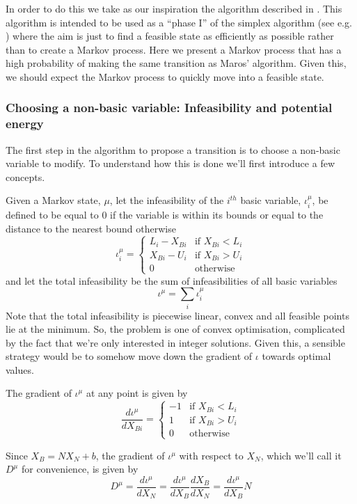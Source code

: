 \documentclass{article}
\begin{document}
In order to do this we take as our inspiration the algorithm described in \cite{maros1986general}. This algorithm is intended to be used as a ``phase I'' of the simplex algorithm (see e.g. \cite{vanderbei2015linear}) where the aim is just to find a feasible state as efficiently as possible rather than to create a Markov process. Here we present a Markov process that has a high probability of making the same transition as Maros' algorithm. Given this, we should expect the Markov process to quickly move into a feasible state.


\subsubsection{Choosing a non-basic variable: Infeasibility and potential energy}

The first step in the algorithm to propose a transition is to choose a non-basic variable to modify. To understand how this is done we'll first introduce a few concepts.

Given a Markov state, $\mu$, let the infeasibility of the $i^{th}$ basic variable, $\iota^\mu_i$, be defined to be equal to 0 if the variable is within its bounds or equal to the distance to the nearest bound otherwise
\[
\iota^\mu_i =
\begin{cases}
L_i-X_{Bi} & \text{if }X_{Bi}<L_i\\
X_{Bi}-U_i & \text{if }X_{Bi}>U_i\\
0 & \text{otherwise}
\end{cases}
\]
and let the total infeasibility be the sum of infeasibilities of all basic variables
\[
\iota^\mu = \sum_i \iota^\mu_i
\]
Note that the total infeasibility is piecewise linear, convex and all feasible points lie at the minimum. So, the problem is one of convex optimisation, complicated by the fact that we're only interested in integer solutions. Given this,  a sensible strategy would be to somehow move down the gradient of $\iota$ towards optimal values.

The gradient of $\iota^\mu$ at any point is given by
\[
\frac{d\iota^\mu}{dX_{Bi}} = 
\begin{cases}
-1 & \text{if }X_{Bi}<L_i\\
1 & \text{if }X_{Bi}>U_i\\
0 & \text{otherwise}
\end{cases}
\]

Since $X_B = NX_N + b$, the gradient of $\iota^\mu$ with respect to $X_N$, which we'll call it $D^\mu$ for convenience, is given by
\[
D^\mu = \frac{d\iota^\mu}{dX_N} = \frac{d\iota^\mu}{dX_B}\frac{dX_B}{dX_N} =  \frac{d\iota^\mu}{dX_B}N
\]
\end{document}
